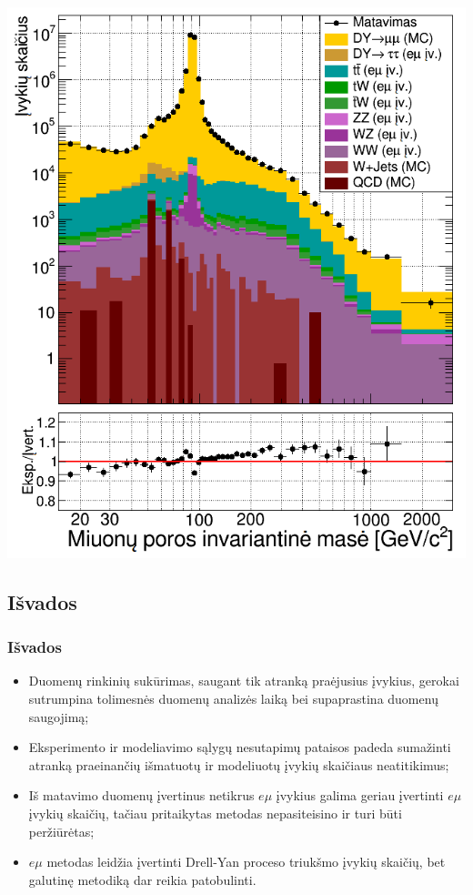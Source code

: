\documentclass[xcolor=dvipsnames]{beamer}
\newcommand{\emu}{\mathit{e}\mu}
\begin{document}
\begin{frame}
\begin{minipage}{0.49\textwidth}
		\includegraphics[width=\textwidth]{mumuMassFinal_SMALL.png}
	\end{minipage}
\end{frame}


\begin{frame}
	\section{Išvados}
	\frametitle{Išvados}
	\begin{itemize}
		\item Duomenų rinkinių sukūrimas, saugant tik atranką praėjusius įvykius, gerokai sutrumpina tolimesnės duomenų analizės
		laiką bei supaprastina duomenų saugojimą;
		\smallskip
		\item Eksperimento ir modeliavimo sąlygų nesutapimų pataisos padeda sumažinti atranką praeinančių
		išmatuotų ir modeliuotų įvykių skaičiaus neatitikimus;
		\smallskip
		\item Iš matavimo duomenų įvertinus netikrus $\emu$ įvykius galima geriau įvertinti $\emu$ įvykių skaičių, tačiau pritaikytas
		metodas nepasiteisino ir turi būti peržiūrėtas;
		\smallskip
		\item $\emu$ metodas leidžia įvertinti Drell-Yan proceso triukšmo įvykių skaičių, bet galutinę metodiką dar reikia patobulinti.
	\end{itemize}
\end{frame}
\end{document}
